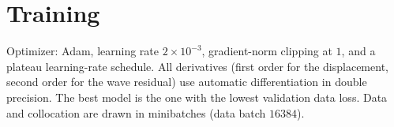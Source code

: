 \documentclass[11pt]{article}
\begin{document}
\section{Training}
Optimizer: Adam, learning rate $2\times10^{-3}$, gradient-norm clipping at $1$,
and a plateau learning-rate schedule. All derivatives (first order for the
displacement, second order for the wave residual) use automatic differentiation
in double precision. The best model is the one with the lowest validation data
loss. Data and collocation are drawn in minibatches (data batch $16384$).
\end{document}
